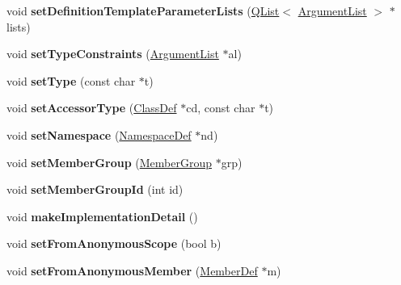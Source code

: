 \begin{DoxyCompactItemize}
\item 
\mbox{\label{class_member_def_a7c29d9839b089978817fcd155964a9b7}} 
void {\bfseries set\+Definition\+Template\+Parameter\+Lists} (\mbox{\hyperlink{class_q_list}{Q\+List}}$<$ \mbox{\hyperlink{class_argument_list}{Argument\+List}} $>$ $\ast$lists)
\item 
\mbox{\label{class_member_def_aa6281d047fccf97ecafdcc319afb3d79}} 
void {\bfseries set\+Type\+Constraints} (\mbox{\hyperlink{class_argument_list}{Argument\+List}} $\ast$al)
\item 
\mbox{\label{class_member_def_a8e7b72ff6ab51a0e4ed6da73a67f17ca}} 
void {\bfseries set\+Type} (const char $\ast$t)
\item 
\mbox{\label{class_member_def_a1c9f50c30b0477ff25e43cf989b21088}} 
void {\bfseries set\+Accessor\+Type} (\mbox{\hyperlink{class_class_def}{Class\+Def}} $\ast$cd, const char $\ast$t)
\item 
\mbox{\label{class_member_def_ab3e985bd6ea55fdec7e111d0c657391f}} 
void {\bfseries set\+Namespace} (\mbox{\hyperlink{class_namespace_def}{Namespace\+Def}} $\ast$nd)
\item 
\mbox{\label{class_member_def_a80790640122e12a3aec24f6f71d1479a}} 
void {\bfseries set\+Member\+Group} (\mbox{\hyperlink{class_member_group}{Member\+Group}} $\ast$grp)
\item 
\mbox{\label{class_member_def_aff606a06a83e3c7b19225ff9ec7c0515}} 
void {\bfseries set\+Member\+Group\+Id} (int id)
\item 
\mbox{\label{class_member_def_a5dcc96e0a4082fa0fd115a42d68b8d5f}} 
void {\bfseries make\+Implementation\+Detail} ()
\item 
\mbox{\label{class_member_def_aed549a699052b1427a768c7fc40f1408}} 
void {\bfseries set\+From\+Anonymous\+Scope} (bool b)
\item 
\mbox{\label{class_member_def_aafa5f4cbcf4725cedc9ade6c18846454}} 
void {\bfseries set\+From\+Anonymous\+Member} (\mbox{\hyperlink{class_member_def}{Member\+Def}} $\ast$m)

\end{DoxyCompactItemize}
